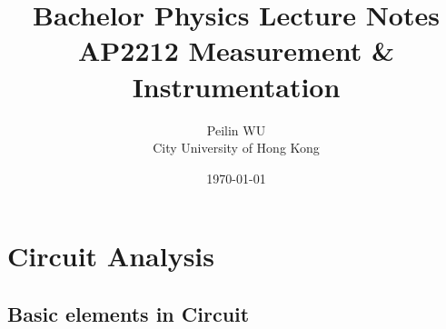 \documentclass[UTF8]{article}
\begin{document}
\title{Bachelor Physics Lecture Notes\\ AP2212  Measurement \& Instrumentation
}
\author{Peilin \textsc{WU}
 \\City University of Hong Kong
 } 
\date{\today}

 
\maketitle
\tableofcontents

\newpage
\section{Circuit Analysis}
\subsection{Basic elements in Circuit}
\end{document}

